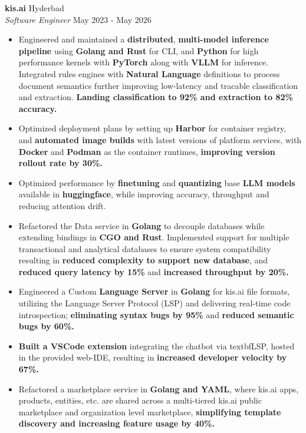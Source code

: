 \documentclass[a4paper]{article}
\begin{document}
\textbf{kis.ai} \hfill Hyderbad\\
\textit{Software Engineer} \hfill May 2023 - May 2026\\
\vspace{-1mm}
\begin{itemize} \itemsep 1pt
    \item Engineered and maintained a \textbf{distributed}, \textbf{multi-model inference pipeline} using \textbf{Golang and Rust} for CLI, and \textbf{Python} for high performance kernels with \textbf{PyTorch} along with \textbf{VLLM} for inference. Integrated rules engines with \textbf{Natural Language} definitions to process document semantics further improving low-latency and tracable classification and extraction. \textbf{Landing classification to 92\% and extraction to 82\% accuracy.}
    \item Optimized deployment plans by setting up \textbf{Harbor} for container registry, and \textbf{automated image builds} with latest versions of platform services, with \textbf{Docker} and \textbf{Podman} as the container runtimes, \textbf{improving version rollout rate by 30\%.}
    \item Optimized performance by \textbf{finetuning} and \textbf{quantizing} base \textbf{LLM models} available in \textbf{huggingface}, while improving accuracy, throughput and reducing attention drift.
    \item Refactored the Data service in \textbf{Golang} to decouple databases while extending bindings in \textbf{CGO and Rust}. Implemented support for multiple transactional and analytical databases to ensure system compatibility resulting in \textbf{reduced complexity to support new database}, and \textbf{reduced query latency by 15\%} and \textbf{increased throughput by 20\%.}
    \item Engineered a Custom \textbf{Language Server} in \textbf{Golang} for kis.ai file formats, utilizing the Language Server Protocol (LSP) and delivering real-time code introspection; \textbf{eliminating syntax bugs by 95\%} and \textbf{reduced semantic bugs by 60\%.}
    \item \textbf{Built a VSCode extension} integrating the chatbot via textbf{LSP}, hosted in the provided web-IDE, resulting in \textbf{increased developer velocity by 67\%.}
	\item Refactored a marketplace service in \textbf{Golang and YAML}, where kis.ai apps, products, entities, etc. are shared across a multi-tiered kis.ai public marketplace and organization level marketplace, \textbf{simplifying template discovery and increasing feature usage by 40\%.}

\end{itemize}
\end{document}

